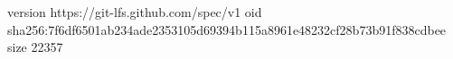 version https://git-lfs.github.com/spec/v1
oid sha256:7f6df6501ab234ade2353105d69394b115a8961e48232cf28b73b91f838cdbee
size 22357

